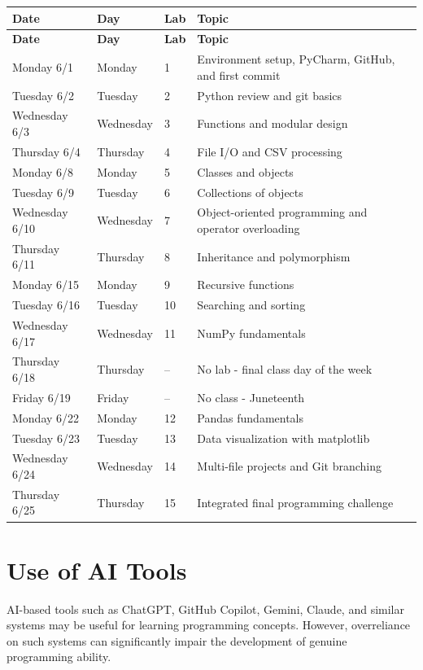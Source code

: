 \documentclass[11pt]{article}
\begin{document}
\begin{longtable}{@{}p{}p{}p{}p{}@{}}
\toprule
\textbf{Date} & \textbf{Day} & \textbf{Lab} & \textbf{Topic} \\
\midrule
\endfirsthead
\toprule
\textbf{Date} & \textbf{Day} & \textbf{Lab} & \textbf{Topic} \\
\midrule
\endhead
Monday 6/1 & Monday & 1 & Environment setup, PyCharm, GitHub, and first commit \\
Tuesday 6/2 & Tuesday & 2 & Python review and git basics \\
Wednesday 6/3 & Wednesday & 3 & Functions and modular design \\
Thursday 6/4 & Thursday & 4 & File I/O and CSV processing \\
\addlinespace
Monday 6/8 & Monday & 5 & Classes and objects \\
Tuesday 6/9 & Tuesday & 6 & Collections of objects \\
Wednesday 6/10 & Wednesday & 7 & Object-oriented programming and operator overloading \\
Thursday 6/11 & Thursday & 8 & Inheritance and polymorphism \\
\addlinespace
Monday 6/15 & Monday & 9 & Recursive functions \\
Tuesday 6/16 & Tuesday & 10 & Searching and sorting \\
Wednesday 6/17 & Wednesday & 11 & NumPy fundamentals \\
Thursday 6/18 & Thursday & -- & No lab - final class day of the week \\
Friday 6/19 & Friday & -- & No class - Juneteenth \\
\addlinespace
Monday 6/22 & Monday & 12 & Pandas fundamentals \\
Tuesday 6/23 & Tuesday & 13 & Data visualization with matplotlib \\
Wednesday 6/24 & Wednesday & 14 & Multi-file projects and Git branching \\
Thursday 6/25 & Thursday & 15 & Integrated final programming challenge \\
\bottomrule
\end{longtable}

\section{Use of AI Tools}

AI-based tools such as ChatGPT, GitHub Copilot, Gemini, Claude, and similar systems may be useful for learning programming concepts. However, overreliance on such systems can significantly impair the development of genuine programming ability.
\end{document}
